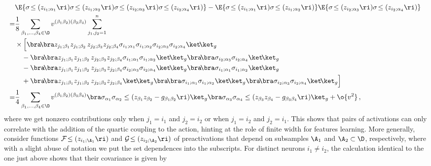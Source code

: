 \begin{align}\label{eq:four-activations-different-deep-connected}
&\E{\sigma\!\le(z_{i_1;\alpha_1}\ri)\sigma\!\le(z_{i_1;\alpha_2}\ri)\sigma\!\le(z_{i_2;\alpha_3}\ri)\sigma\!\le(z_{i_2;\alpha_4}\ri)}-\E{\sigma\!\le(z_{i_1;\alpha_1}\ri)\sigma\!\le(z_{i_1;\alpha_2}\ri)}\E{\sigma\!\le(z_{i_2;\alpha_3}\ri)\sigma\!\le(z_{i_2;\alpha_4}\ri)}\, \nonumber\\
=&\frac{1}{8}\sum_{\beta_1,\ldots,\beta_4\in\D}v^{(\beta_1\beta_2)(\beta_3\beta_4)}\sum_{j_1,j_2=1}^{n}\, \\
&\times\Big[\bra\!\bra z_{j_1;\beta_1}z_{j_1;\beta_2}\, z_{j_2;\beta_3}z_{j_2;\beta_4} \sigma_{i_1;\alpha_1} \sigma_{i_1;\alpha_2} \sigma_{i_2;\alpha_3}\sigma_{i_2;\alpha_4}   \ket\!\ket_{g}\, \nonumber\\
&\quad -\bra\!\bra z_{j_1;\beta_1}z_{j_1;\beta_2}\, z_{j_2;\beta_3}z_{j_2;\beta_4} \sigma_{i_1;\alpha_1} \sigma_{i_1;\alpha_2} \ket\!\ket_{g}\bra\!\bra\sigma_{i_2;\alpha_3}\sigma_{i_2;\alpha_4}   \ket\!\ket_{g}\, \nonumber\\
&\quad -\bra\!\bra z_{j_1;\beta_1}z_{j_1;\beta_2}\, z_{j_2;\beta_3}z_{j_2;\beta_4} \sigma_{i_2;\alpha_3} \sigma_{i_2;\alpha_4} \ket\!\ket_{g}\bra\!\bra\sigma_{i_1;\alpha_1}\sigma_{i_1;\alpha_2}   \ket\!\ket_{g}\, \nonumber\\
&\quad +\bra\!\bra z_{j_1;\beta_1}z_{j_1;\beta_2}\, z_{j_2;\beta_3}z_{j_2;\beta_4} \ket\!\ket_{g}\bra\!\bra\sigma_{i_1;\alpha_1} \sigma_{i_1;\alpha_2} \ket\!\ket_{g}\bra\!\bra\sigma_{i_2;\alpha_3}\sigma_{i_2;\alpha_4}   \ket\!\ket_{g}\Big]\, \nonumber\\
=&\frac{1}{4}\sum_{\beta_1,\ldots,\beta_4\in\D}v^{(\beta_1\beta_2)(\beta_3\beta_4)}\bra \sigma_{\alpha_1}\sigma_{\alpha_2} \le(z_{\beta_1} z_{\beta_2}-g_{\beta_1\beta_2}\ri)\ket_{g}\bra \sigma_{\alpha_3}\sigma_{\alpha_4} \le(z_{\beta_3} z_{\beta_4}-g_{\beta_3\beta_4}\ri)\ket_{g}+\o{v^2}\, ,\nonumber 
\end{align}
where we get nonzero contributions only when $j_1=i_1$ and $j_2=i_2$ or when $j_1=i_2$ and $j_2=i_1$.
This shows that pairs of activations can only correlate with the addition of the quartic coupling to the action, hinting at the role of finite width for features learning.
More generally, consider functions $\mathcal{F}\!\le(z_{i_1;\A_1}\ri)$
and $\mathcal{G}\!\le(z_{i_2; \A_2}\ri)$
of preactivations that depend on subsamples $\A_1$ and $\A_2\subset\D$, respectively, where with a slight abuse of notation we put the set dependences into the subscripts. For distinct neurons $i_1\ne i_2$, the calculation identical to the one just above shows that their covariance is given by
